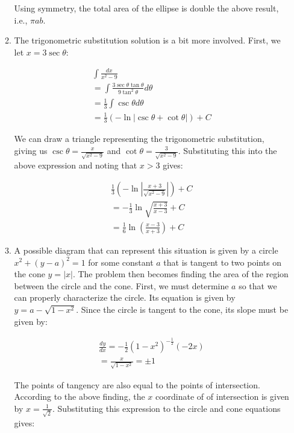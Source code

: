 \begin{enumerate}
\begin{enumerate}
	    Using symmetry, the total area of the ellipse is double the above result, i.e., $\pi ab$.

        \item The trigonometric substitution solution is a bit more involved. First, we let $x = 3\sec{\theta}$:
	    
	    \begin{align*}
	        \int\frac{dx}{x^2-9} \\
	        = \int\frac{3\sec\theta\tan\theta}{9\tan^2\theta}d\theta \\
	        = \frac{1}{3}\int \csc\theta d\theta \\
	        = \frac{1}{3}\left(-\ln|\csc\theta + \cot\theta|\right) + C
	    \end{align*}
	    
	    We can draw a triangle representing the trigonometric substitution, giving us $\csc\theta = \frac{x}{\sqrt{x^2 - 9}}$ and $\cot\theta = \frac{3}{\sqrt{x^2 - 9}}$. Substituting this into the above expression and noting that $x > 3$ gives:
	    
	    \begin{align*}
	        \frac{1}{3}\left(-\ln\left|\frac{x+3}{\sqrt{x^2 - 9}}\right|\right) + C\\
	        = -\frac{1}{3}\ln\sqrt{\frac{x+3}{x-3}} + C\\
	        = \frac{1}{6}\ln\left(\frac{x-3}{x+3}\right) + C
	    \end{align*}

        \item A possible diagram that can represent this situation is given by a circle $x^2 + (y - a)^2 = 1$ for some constant $a$ that is tangent to two points on the cone $y = |x|$. The problem then becomes finding the area of the region between the circle and the cone. First, we must determine $a$ so that we can properly characterize the circle. Its equation is given by $y = a - \sqrt{1 - x^2}$. Since the circle is tangent to the cone, its slope must be given by: 
	    
	    \begin{align*}
	        \frac{dy}{dx} = -\frac{1}{2}\left(1 - x^2\right)^{-\frac{1}{2}}(-2x) \\
	        = \frac{x}{\sqrt{1 - x^2}}
	        = \pm 1
	    \end{align*}
	    
	    The points of tangency are also equal to the points of intersection. According to the above finding, the $x$ coordinate of of intersection is given by $x = \frac{1}{\sqrt{2}}$. Substituting this expression to the circle and cone equations gives:
	    

\end{enumerate}
\end{enumerate}
